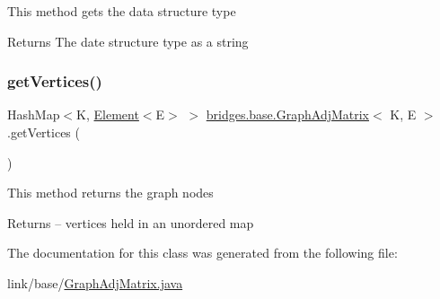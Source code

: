 This method gets the data structure type

\begin{DoxyReturn}{Returns}
The date structure type as a string 
\end{DoxyReturn}
\hypertarget{classbridges_1_1base_1_1_graph_adj_matrix_ac8270b3cbc4cf5f2f03c555ac6055423}{}\label{classbridges_1_1base_1_1_graph_adj_matrix_ac8270b3cbc4cf5f2f03c555ac6055423} 
\subsubsection{\texorpdfstring{get\+Vertices()}{getVertices()}}
{\footnotesize\ttfamily Hash\+Map$<$K, \hyperlink{classbridges_1_1base_1_1_element}{Element}$<$E$>$ $>$ \hyperlink{classbridges_1_1base_1_1_graph_adj_matrix}{bridges.\+base.\+Graph\+Adj\+Matrix}$<$ K, E $>$.get\+Vertices (\begin{DoxyParamCaption}{ }\end{DoxyParamCaption})}

This method returns the graph nodes

\begin{DoxyReturn}{Returns}
-- vertices held in an unordered map 
\end{DoxyReturn}


The documentation for this class was generated from the following file\+:\begin{DoxyCompactItemize}
\item 
link/base/\hyperlink{_graph_adj_matrix_8java}{Graph\+Adj\+Matrix.\+java}\end{DoxyCompactItemize}
